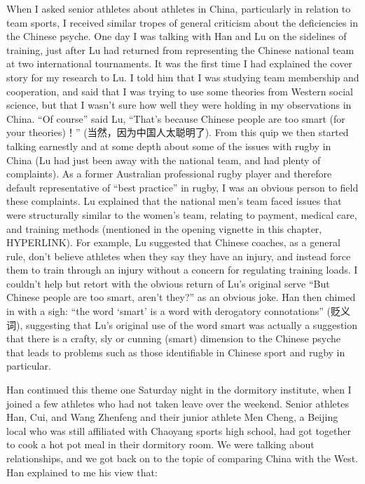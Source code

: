 \begin{CJK}{UTF8}{gbsn}
  When I asked senior athletes about athletes in China, particularly in relation to team sports, I received similar tropes of general  criticism about the deficiencies in the Chinese psyche.  One day I was talking with Han and Lu on the sidelines of training, just after Lu had returned from representing the Chinese national team at two international tournaments. It was the first time I had explained the cover story for my research to Lu.  I told him that I was studying team membership and cooperation, and said that I was trying to use some theories from Western social science, but that I wasn't sure how well they were holding in my observations in China. ``Of course'' said Lu, ``That's because Chinese people are too smart (for your theories)！''  (当然，因为中国人太聪明了).  From this quip we then started talking earnestly and at some depth about some of the issues with rugby in China (Lu had just been away with the national team, and had plenty of complaints).  As a former Australian professional rugby player and therefore default representative of ``best practice'' in rugby, I was an obvious person to field these complaints. Lu explained that the national men's team faced issues that were structurally similar to the women's team, relating to payment, medical care, and training methods (mentioned in the opening vignette in this chapter, HYPERLINK).  For example, Lu suggested that Chinese coaches, as a general rule, don't believe athletes when they say they have an injury, and instead force them to train through an injury without a concern for regulating training loads. I couldn't help but retort with the obvious return of Lu's original serve ``But Chinese people are too smart, aren't they?'' as an obvious joke.  Han then chimed in with a sigh: ``the word `smart' is a word with derogatory connotations'' (贬义词), suggesting that Lu's original use of the word smart was actually a suggestion that there is a crafty, sly or cunning (smart) dimension to the Chinese psyche that leads to problems such as those identifiable in Chinese sport and rugby in particular.

  Han continued this theme one Saturday night in the dormitory institute, when I joined a few athletes who had not taken leave over the weekend. Senior athletes Han, Cui, and Wang Zhenfeng and their junior athlete Men Cheng, a Beijing local who was still affiliated with Chaoyang sports high school, had got together to cook a hot pot meal in their dormitory room.  We were talking about relationships, and we got back on to the topic of comparing China with the West.  Han explained to me his view that:


\end{CJK}
